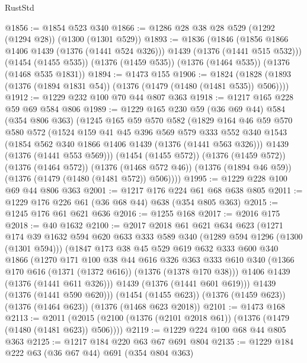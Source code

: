 \begin{lexlean}{RustStd}
\begin{coremodule}
{\begin{coremodule}
{{{{{@1856 := @1854 @523 @340
@1866 := @1286 @28 @38 @28 @529 (@1292 (@1294 @28)) (@1300 (@1301 @529))
@1893 := @1836
    (@1846 (@1856 @1866 @1406 @1439 (@1376 (@1441 @524 @326))) @1439 (@1376 (@1441 @515 @532)))
    (@1454 (@1455 @535))
    (@1376 (@1459 @535))
    (@1376 (@1464 @535))
    (@1376 (@1468 @535 @1831))
@1894 := @1473 @155
@1906 := @1824 (@1828 (@1893 (@1376 (@1894 @1831 @54)) (@1376 (@1479 (@1480 (@1481 @535)) @506))))
@1912 := @1229 @232 @100 @70 @44 @807 @363
@1918 := @1217 @165 @228 @59 @69 @584 @806
@1989 := @1229
    @165
    @230
    @59
    (@36 @69 @44)
    @584
    (@354 @806 @363)
    (@1245
      @165
      @59
      @570
      @582
      (@1829
        @164
        @46
        @59
        @570
        @580
        @572
        (@1524
          @159
          @41
          @45
          @396
          @569
          @579
          @333
          @552
          @340
          @1543
          (@1854 @562 @340 @1866 @1406 @1439 (@1376 (@1441 @563 @326)))
          @1439
          (@1376 (@1441 @553 @569)))
        (@1454 (@1455 @572))
        (@1376 (@1459 @572))
        (@1376 (@1464 @572))
        (@1376 (@1468 @572 @46))
        (@1376 (@1894 @46 @59))
        (@1376 (@1479 (@1480 (@1481 @572)) @506))))
@1995 := @1229 @228 @100 @69 @44 @806 @363
@2001 := @1217 @176 @224 @61 @68 @638 @805
@2011 := @1229 @176 @226 @61 (@36 @68 @44) @638 (@354 @805 @363)
@2015 := @1245 @176 @61 @621 @636
@2016 := @1255 @168
@2017 := @2016 @175
@2018 := @40 @1632
@2100 := @2017
    @2018
    @61
    @621
    @634
    @623
    (@1271
      @174
      @39
      @1632
      @594
      @620
      @633
      @333
      @589
      @340
      (@1289 @594 @1296 (@1300 (@1301 @594)))
      (@1847
        @173
        @38
        @45
        @529
        @619
        @632
        @333
        @600
        @340
        @1866
        (@1270
          @171
          @100
          @38
          @44
          @616
          @326
          @363
          @333
          @610
          @340
          (@1366 @170 @616 (@1371 (@1372 @616)) (@1376 (@1378 @170 @38)))
          @1406
          @1439
          (@1376 (@1441 @611 @326)))
        @1439
        (@1376 (@1441 @601 @619)))
      @1439
      (@1376 (@1441 @590 @620)))
    (@1454 (@1455 @623))
    (@1376 (@1459 @623))
    (@1376 (@1464 @623))
    (@1376 (@1468 @623 @2018))
@2101 := @1473 @168
@2113 := @2011 (@2015 (@2100 (@1376 (@2101 @2018 @61)) (@1376 (@1479 (@1480 (@1481 @623)) @506))))
@2119 := @1229 @224 @100 @68 @44 @805 @363
@2125 := @1217 @184 @220 @63 @67 @691 @804
@2135 := @1229 @184 @222 @63 (@36 @67 @44) @691 (@354 @804 @363)
}}}}}
\end{coremodule}}
\end{coremodule}
\end{lexlean}
